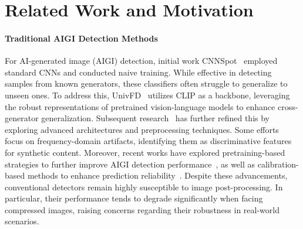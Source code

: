 \documentclass{article}
\theoremstyle{plain}
\theoremstyle{definition}
\theoremstyle{remark}
\begin{document}
\section{Related Work and Motivation}
\paragraph{Traditional AIGI Detection Methods}
For AI-generated image (AIGI) detection, initial work CNNSpot~\citep{wang2020cnn} employed standard CNNs and conducted naive training. 
While effective in detecting samples from known generators, these classifiers often struggle to generalize to unseen ones.
To address this, UnivFD~\citep{ojha2023towards} utilizes CLIP as a backbone, leveraging the robust representations of pretrained vision-language models to enhance cross-generator generalization. 
Subsequent research~\citep{liu2024forgery,tan2025c2p,zheng2024breaking,yan2025orthogonal, tan2024rethinking, yan2025dgs, yan2025ns,shen2025dino,repdfd,liu2026mirror,liu2025beyond} has further refined this by exploring advanced architectures and preprocessing techniques. 
Some efforts~\citep{tan2024frequency,chu2025fire,li2025improving,karageorgiou2025any,yan2026dual} focus on frequency-domain artifacts, identifying them as discriminative features for synthetic content. 
Moreover, recent works have explored pretraining-based strategies to further improve AIGI detection performance~\cite{zhou2026simplicity,li2025ditl2}, as well as calibration-based methods to enhance prediction reliability~\cite{li2026texture,guillaro2026quality}.
Despite these advancements, conventional detectors remain highly susceptible to image post-processing. 
In particular, their performance tends to degrade significantly when facing compressed images, raising concerns regarding their robustness in real-world scenarios.
\end{document}
